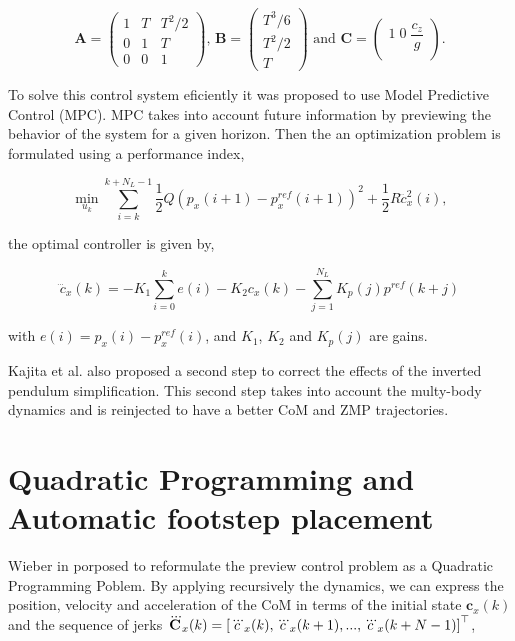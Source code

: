 \begin{equation*}
{\mathbf A} = \left(
\begin{matrix}
1 & T & T^2/2 \\
0 & 1 & T \\
0 & 0 & 1
\end{matrix}
\right) \text{, }
{\mathbf B} = \left(
\begin{matrix}
T^3/6 \\
T^2/2 \\
T
\end{matrix}
\right) \text{ and }
{\mathbf C} = \left(
\begin{matrix}
1 \; 0 \; \dfrac{c_z}{g} \\
\end{matrix}
\right).
\end{equation*}

To solve this control system eficiently it was proposed to use Model Predictive Control (MPC). MPC takes into account future information by previewing the behavior of the system for a given horizon. Then the an optimization problem is formulated using a performance index,

\begin{equation}
\min_{u_k} \sum\limits_{i=k}^{k+N_L - 1} \frac{1}{2} Q (p_x(i+1) - p_x^{ref}(i+1))^2 + \frac{1}{2}R\dddot{c}_x^2(i),
\end{equation}

the optimal controller is given by,

\begin{equation}
\dddot{c}_x(k) = -K_1 \sum\limits_{i=0}^{k} e(i)-K_2c_x(k) - \sum\limits_{j=1}^{N_L} K_p(j)p^{ref}(k+j)
\end{equation}

with $e(i) = p_x(i) - p_x^{ref}(i)$, and $K_1$, $K_2$ and $K_p(j)$ are gains.

Kajita et al. also proposed a second step to correct the effects of the inverted pendulum simplification. This second step takes into account the multy-body dynamics and is reinjected to have a better CoM and ZMP trajectories.

\section{Quadratic Programming and Automatic footstep placement}

Wieber in \citep{WieberHumanoids2006} porposed to reformulate the preview control problem as a Quadratic Programming Poblem. By applying recursively the dynamics, we can express the position, velocity and acceleration  of the CoM in terms of the initial state ${\mathbf c}_x(k)$ and the sequence of jerks $\dddot{\mathbf C}_x(k) = \left[ \dddot{c}_x(k), \dddot{c}_x(k+1),...,\dddot{c}_x(k+N-1) \right]^{\top}$,

